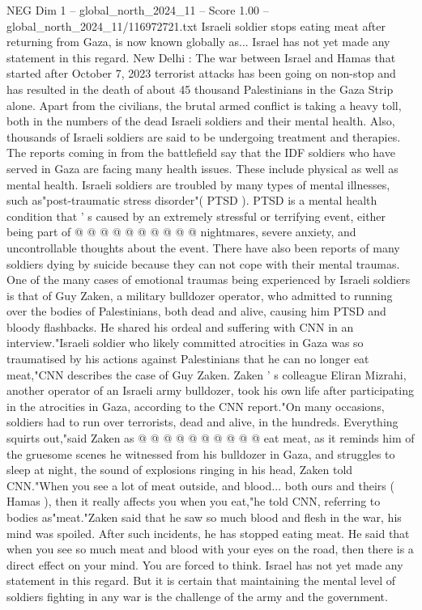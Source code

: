 \begin{textsample}{NEG Dim 1 – global\_north\_2024\_11 – Score 1.00 – global\_north\_2024\_11/116972721.txt}  \label{ex:f1_neg_219}
Israeli soldier stops eating meat after returning from Gaza, is now known globally as...
Israel has not yet made any statement in this regard.
New Delhi : The war between Israel and Hamas that started after October 7, 2023 terrorist attacks has been going on non-stop and has resulted in the death of about 45 thousand Palestinians in the Gaza Strip alone.
Apart from the civilians, the brutal armed conflict is taking a heavy toll, both in the numbers of the dead Israeli soldiers and their mental health.
Also, thousands of Israeli soldiers are said to be undergoing treatment and therapies.
The reports coming in from the battlefield say that the IDF soldiers who have served in Gaza are facing many health issues.
These include physical as well as mental health.
Israeli soldiers are troubled by many types of mental illnesses, such as"post-traumatic stress disorder"( PTSD ).
PTSD is a mental health condition that ' s caused by an extremely stressful or terrifying event, either being part of @ @ @ @ @ @ @ @ @ @ nightmares, severe anxiety, and uncontrollable thoughts about the event.
There have also been reports of many soldiers dying by suicide because they can not cope with their mental traumas.
One of the many cases of emotional traumas being experienced by Israeli soldiers is that of Guy Zaken, a military bulldozer operator, who admitted to running over the bodies of Palestinians, both dead and alive, causing him PTSD and bloody flashbacks.
He shared his ordeal and suffering with CNN in an interview."Israeli soldier who likely committed atrocities in Gaza was so traumatised by his actions against Palestinians that he can no longer eat meat,"CNN describes the case of Guy Zaken.
Zaken ' s colleague Eliran Mizrahi, another operator of an Israeli army bulldozer, took his own life after participating in the atrocities in Gaza, according to the CNN report."On many occasions, soldiers had to run over terrorists, dead and alive, in the hundreds.
Everything squirts out,"said Zaken as @ @ @ @ @ @ @ @ @ @ eat meat, as it reminds him of the gruesome scenes he witnessed from his bulldozer in Gaza, and struggles to sleep at night, the sound of explosions ringing in his head, Zaken told CNN."When you see a lot of meat outside, and blood... both ours and theirs ( Hamas ), then it really affects you when you eat,"he told CNN, referring to bodies as"meat."Zaken said that he saw so much blood and flesh in the war, his mind was spoiled.
After such incidents, he has stopped eating meat.
He said that when you see so much meat and blood with your eyes on the road, then there is a direct effect on your mind.
You are forced to think.
Israel has not yet made any statement in this regard.
But it is certain that maintaining the mental level of soldiers fighting in any war is the challenge of the army and the government.

\end{textsample}
